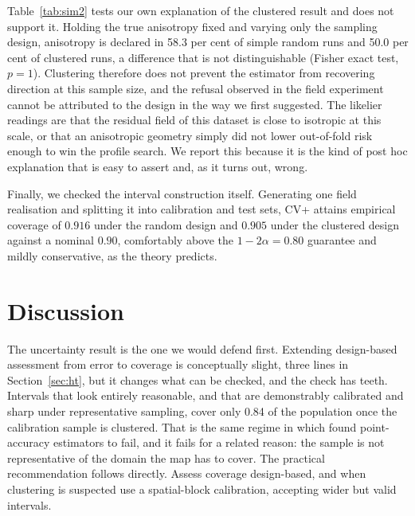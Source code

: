 \documentclass[preprint,12pt,authoryear]{elsarticle}
\begin{document}
\begin{table}[!ht]
\centering
\caption{Simulation S1. Proportion of runs in which anisotropy is declared, by
true ratio and signal-to-noise ratio, under simple random sampling with 500
points. A true ratio of 1 is an isotropic field.}
\label{tab:sim1}
\small

\end{table}

Table~\ref{tab:sim2} tests our own explanation of the clustered result and does
not support it. Holding the true anisotropy fixed and varying only the sampling
design, anisotropy is declared in 58.3 per cent of simple random runs and 50.0
per cent of clustered runs, a difference that is not distinguishable
(Fisher exact test, $p = 1$). Clustering therefore does not prevent the
estimator from recovering direction at this sample size, and the refusal
observed in the field experiment cannot be attributed to the design in the way
we first suggested. The likelier readings are that the residual field of this
dataset is close to isotropic at this scale, or that an anisotropic geometry
simply did not lower out-of-fold risk enough to win the profile search. We
report this because it is the kind of post hoc explanation that is easy to
assert and, as it turns out, wrong.

\begin{table}[!ht]
\centering
\caption{Simulation S2. Proportion of runs declaring anisotropy when the true
geometry is held fixed and only the sampling design changes.}
\label{tab:sim2}
\small

\end{table}

Finally, we checked the interval construction itself. Generating one field
realisation and splitting it into calibration and test sets, CV+ attains
empirical coverage of $0.916$ under the random design and $0.905$ under the
clustered design against a nominal $0.90$, comfortably above the
$1-2\alpha = 0.80$ guarantee and mildly conservative, as the theory predicts.

\section{Discussion}

The uncertainty result is the one we would defend first. Extending design-based
assessment from error to coverage is conceptually slight, three lines in
Section~\ref{sec:ht}, but it changes what can be checked, and the check has
teeth. Intervals that look entirely reasonable, and that are demonstrably
calibrated and sharp under representative sampling, cover only 0.84 of the
population once the calibration sample is clustered. That is the same regime in
which \citet{wadoux2021} found point-accuracy estimators to fail, and it fails
for a related reason: the sample is not representative of the domain the map has
to cover. The practical recommendation follows directly. Assess coverage
design-based, and when clustering is suspected use a spatial-block calibration,
accepting wider but valid intervals.
\end{document}
